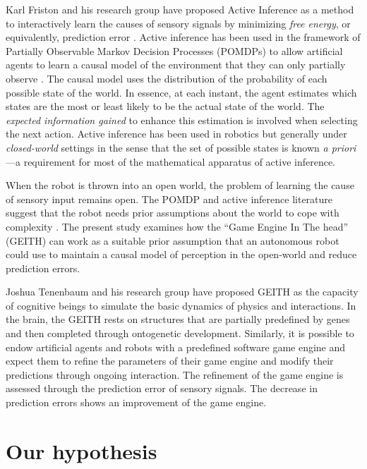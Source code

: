 \documentclass[runningheads]{llncs}
\begin{document}
Karl Friston and his research group have proposed Active Inference as a method to interactively  learn the causes of sensory signals  by minimizing \textit{free energy}, or equivalently, prediction error \cite{friston_free-energy_2010}.
Active inference has been used in the framework of Partially Observable Markov Decision Processes (POMDPs) to allow artificial agents to learn a causal model of the environment that they can only partially observe \cite{smith_step-by-step_2022}. 
The causal model uses the distribution of the probability of each possible state of the world. 
In essence, at each instant, the agent estimates which states are the most or least likely to be the actual state of the world.
The \textit{expected information gained} to enhance this estimation is involved when selecting the next action.
Active inference has been used in robotics \cite{lanillos_active_2021} but generally under \textit{closed-world} settings in the sense that the set of possible states is known \textit{a priori}---a requirement for most of the mathematical apparatus of active inference. 

When the robot is thrown into an open world, the problem of learning the cause of sensory input remains open. 
The POMDP and active inference literature suggest that the robot needs prior assumptions about the world to cope with complexity \cite{georgeon_artificial_2024}. 
The present study examines how the ``Game Engine In The head'' (GEITH) can work as a suitable prior assumption that an autonomous robot could use to maintain a causal model of perception in the open-world and reduce prediction errors. 

Joshua Tenenbaum and his research group have proposed GEITH \cite{battaglia_simulation_2013} as the capacity of cognitive beings to simulate the basic dynamics of physics and interactions. 
In the brain, the GEITH rests on structures that are partially predefined by genes and then completed through ontogenetic development.  
Similarly, it is possible to endow artificial agents and robots with a predefined software game engine and expect them to refine the parameters of their game engine and modify their predictions through ongoing interaction.
The refinement of the game engine is assessed through 
the prediction error of sensory signals. 
The decrease in prediction errors shows an improvement of the game engine. 




\section{Our hypothesis}
\end{document}
